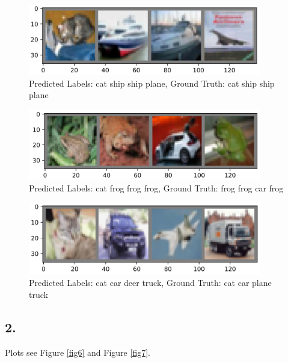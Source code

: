 \documentclass[twoside,12pt]{homework}
\begin{document}
\begin{figure}[!htb]
\begin{center}
\includegraphics[width=4in]{00.png}
\caption{Predicted Labels: cat ship ship plane, Ground Truth: cat ship ship plane}
\label{fig3}
\end{center}
\end{figure}

\begin{figure}[!htb]
\begin{center}
\includegraphics[width=4in]{01.png}
\caption{Predicted Labels: cat frog frog frog, Ground Truth: frog frog car frog}
\label{fig4}
\end{center}
\end{figure}

\begin{figure}[!htb]
\begin{center}
\includegraphics[width=4in]{02.png}
\caption{Predicted Labels: cat car deer truck, Ground Truth: cat car plane truck}
\label{fig5}
\end{center}
\end{figure}

\subsection*{2.}

Plots see Figure \ref{fig6} and Figure \ref{fig7}.
\end{document}
